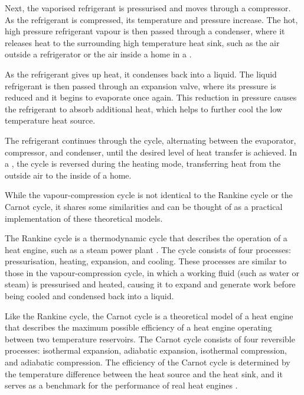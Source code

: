 Next, the vaporised refrigerant is pressurised and moves through a compressor. As the refrigerant is compressed, its temperature and pressure increase. The hot, high pressure refrigerant vapour is then passed through a condenser, where it releases heat to the surrounding high temperature heat sink, such as the air outside a refrigerator or the air inside a home in a \HP.

As the refrigerant gives up heat, it condenses back into a liquid. The liquid refrigerant is then passed through an expansion valve, where its pressure is reduced and it begins to evaporate once again. This reduction in pressure causes the refrigerant to absorb additional heat, which helps to further cool the low temperature heat source.

The refrigerant continues through the cycle, alternating between the evaporator, compressor, and condenser, until the desired level of heat transfer is achieved. In a \HP, the cycle is reversed during the heating mode, transferring heat from the outside air to the inside of a home.

While the vapour-compression cycle is not identical to the Rankine cycle or the Carnot cycle, it shares some similarities and can be thought of as a practical implementation of these theoretical models.

The Rankine cycle is a thermodynamic cycle that describes the operation of a heat engine, such as a steam power plant \cite{cengel_thermo_2020}. The cycle consists of four processes: pressurisation, heating, expansion, and cooling. These processes are similar to those in the vapour-compression cycle, in which a working fluid (such as water or steam) is pressurised and heated, causing it to expand and generate work before being cooled and condensed back into a liquid. 

Like the Rankine cycle, the Carnot cycle is a theoretical model of a heat engine that describes the maximum possible efficiency of a heat engine operating between two temperature reservoirs. The Carnot cycle consists of four reversible processes: isothermal expansion, adiabatic expansion, isothermal compression, and adiabatic compression. The efficiency of the Carnot cycle is determined by the temperature difference between the heat source and the heat sink, and it serves as a benchmark for the performance of real heat engines \cite{cengel_thermo_2020}.


